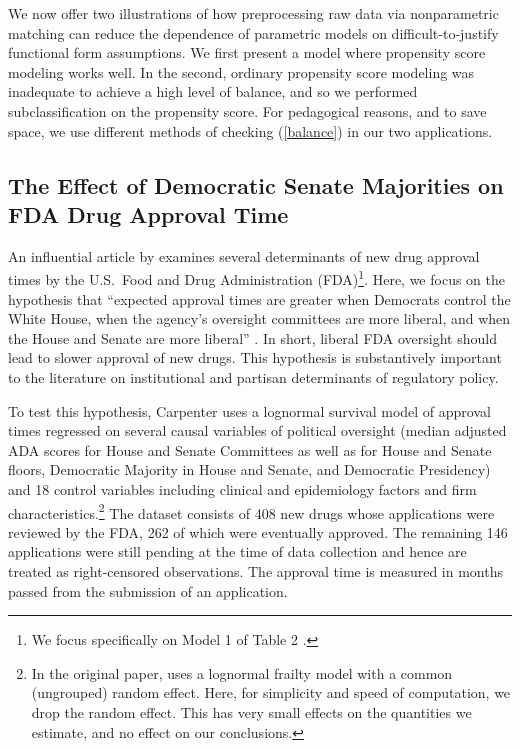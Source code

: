 \documentclass[11pt,titlepage]{article}
\begin{document}
We now offer two illustrations of how preprocessing raw data via
nonparametric matching can reduce the dependence of parametric models
on difficult-to-justify functional form assumptions.  We first present
a model where propensity score modeling works well.  In the second,
ordinary propensity score modeling was inadequate to achieve a high
level of balance, and so we performed subclassification on the
propensity score. For pedagogical reasons, and to save space, we use
different methods of checking (\ref{balance}) in our two applications.

\subsection{The Effect of Democratic Senate Majorities
  on FDA Drug Approval Time}

An influential article by \citet{Carp02} examines several determinants
of new drug approval times by the U.S.\ Food and Drug Administration
(FDA)\footnote{We focus specifically on Model 1 of Table 2 \citep[p.
  499]{Carp02}.}.  Here, we focus on the hypothesis that ``expected
approval times are greater when Democrats control the White House,
when the agency's oversight committees are more liberal, and when the
House and Senate are more liberal'' \citep[p.495]{Carp02}.  In short,
liberal FDA oversight should lead to slower approval of new drugs.
This hypothesis is substantively important to the literature on
institutional and partisan determinants of regulatory policy.

To test this hypothesis, Carpenter uses a lognormal survival model of
approval times regressed on several causal variables of political
oversight (median adjusted ADA scores for House and Senate Committees
as well as for House and Senate floors, Democratic Majority in House
and Senate, and Democratic Presidency) and 18 control variables
including clinical and epidemiology factors and firm
characteristics.\footnote{In the original paper, \citet{Carp02} uses a
  lognormal frailty model with a common (ungrouped) random effect.
  Here, for simplicity and speed of computation, we drop the random
  effect.  This has very small effects on the quantities we estimate,
  and no effect on our conclusions.}  The dataset consists of 408 new
drugs whose applications were reviewed by the FDA, 262 of which were
eventually approved.  The remaining 146 applications were still
pending at the time of data collection and hence are treated as
right-censored observations. The approval time is measured in months
passed from the submission of an application.
\end{document}
